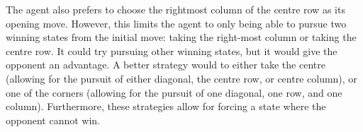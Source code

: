 \documentclass[10pt,letterpaper]{article}
\begin{document}
\begin{enumerate}
		The agent also prefers to choose the rightmost column of the centre row as its opening move.
		However, this limits the agent to only being able to pursue two winning states from the initial move: taking the right-most column or taking the centre row.
		It could try pursuing other winning states, but it would give the opponent an advantage.
		A better strategy would to either take the centre (allowing for the pursuit of either diagonal, the centre row, or centre column), or one of the corners (allowing for the pursuit of one diagonal, one row, and one column).
		Furthermore, these strategies allow for forcing a state where the opponent cannot win.
		
	\end{enumerate}
\end{document}

